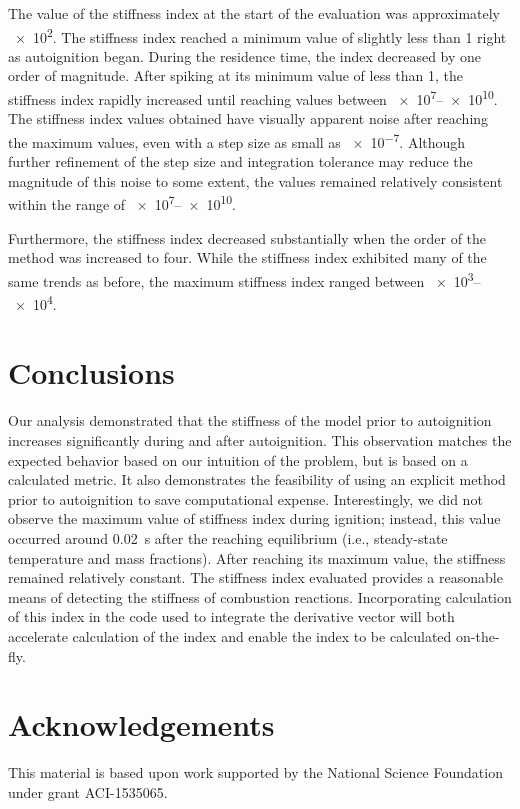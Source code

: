\documentclass[12pt]{ussci}
\begin{document}
The value of the stiffness index at the start of the evaluation was approximately \num{e2}. The stiffness index reached a minimum value of slightly less than 1 right as autoignition began. During the residence time, the index decreased by one order of magnitude. After spiking at its minimum value of less than 1, the stiffness index rapidly increased until reaching values between \numrange{e7}{e10}. The stiffness index values obtained have visually apparent noise after reaching the maximum values, even with a step size as small as \num{e-7}. Although further refinement of the step size and integration tolerance may reduce the magnitude of this noise to some extent, the values remained relatively consistent within the range of \numrange{e7}{e10}.

Furthermore, the stiffness index decreased substantially when the order of the method was increased to four.
While the stiffness index exhibited many of the same trends as before, the maximum stiffness index ranged between \numrange{e3}{e4}.

\section{Conclusions}
%
Our analysis demonstrated that the stiffness of the model prior to autoignition increases significantly during and after autoignition. This observation matches the expected behavior based on our intuition of the problem, but is based on a calculated metric.
It also demonstrates the feasibility of using an explicit method prior to autoignition to save computational expense.
Interestingly, we did not observe the maximum value of stiffness index during ignition; instead, this value occurred around \SI{0.02}{\second} after the reaching equilibrium (i.e., steady-state temperature and mass fractions). After reaching its maximum value, the stiffness remained relatively constant. The stiffness index evaluated provides a reasonable means of detecting the stiffness of combustion reactions. Incorporating calculation of this index in the code used to integrate the derivative vector will both accelerate calculation of the index and enable the index to be calculated on-the-fly.

\section{Acknowledgements}
This material is based upon work supported by the National Science Foundation under grant ACI-1535065.

\printbibliography
\end{document}
